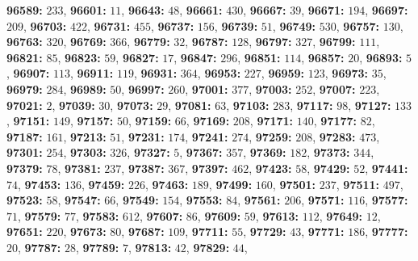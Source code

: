 \textsf{\bfseries 96589:} $233$, \textsf{\bfseries 96601:} $11$, \textsf{\bfseries 96643:} $48$, \textsf{\bfseries 96661:} $430$, \textsf{\bfseries 96667:} $39$, \textsf{\bfseries 96671:} $194$, \textsf{\bfseries 96697:} $209$, \textsf{\bfseries 96703:} $422$, \textsf{\bfseries 96731:} $455$, \textsf{\bfseries 96737:} $156$, \textsf{\bfseries 96739:} $51$, \textsf{\bfseries 96749:} $530$, \textsf{\bfseries 96757:} $130$, \textsf{\bfseries 96763:} $320$, \textsf{\bfseries 96769:} $366$, \textsf{\bfseries 96779:} $32$, \textsf{\bfseries 96787:} $128$, \textsf{\bfseries 96797:} $327$, \textsf{\bfseries 96799:} $111$, \textsf{\bfseries 96821:} $85$, \textsf{\bfseries 96823:} $59$, \textsf{\bfseries 96827:} $17$, \textsf{\bfseries 96847:} $296$, \textsf{\bfseries 96851:} $114$, \textsf{\bfseries 96857:} $20$, \textsf{\bfseries 96893:} $5$, \textsf{\bfseries 96907:} $113$, \textsf{\bfseries 96911:} $119$, \textsf{\bfseries 96931:} $364$, \textsf{\bfseries 96953:} $227$, \textsf{\bfseries 96959:} $123$, \textsf{\bfseries 96973:} $35$, \textsf{\bfseries 96979:} $284$, \textsf{\bfseries 96989:} $50$, \textsf{\bfseries 96997:} $260$, \textsf{\bfseries 97001:} $377$, \textsf{\bfseries 97003:} $252$, \textsf{\bfseries 97007:} $223$, \textsf{\bfseries 97021:} $2$, \textsf{\bfseries 97039:} $30$, \textsf{\bfseries 97073:} $29$, \textsf{\bfseries 97081:} $63$, \textsf{\bfseries 97103:} $283$, \textsf{\bfseries 97117:} $98$, \textsf{\bfseries 97127:} $133$, \textsf{\bfseries 97151:} $149$, \textsf{\bfseries 97157:} $50$, \textsf{\bfseries 97159:} $66$, \textsf{\bfseries 97169:} $208$, \textsf{\bfseries 97171:} $140$, \textsf{\bfseries 97177:} $82$, \textsf{\bfseries 97187:} $161$, \textsf{\bfseries 97213:} $51$, \textsf{\bfseries 97231:} $174$, \textsf{\bfseries 97241:} $274$, \textsf{\bfseries 97259:} $208$, \textsf{\bfseries 97283:} $473$, \textsf{\bfseries 97301:} $254$, \textsf{\bfseries 97303:} $326$, \textsf{\bfseries 97327:} $5$, \textsf{\bfseries 97367:} $357$, \textsf{\bfseries 97369:} $182$, \textsf{\bfseries 97373:} $344$, \textsf{\bfseries 97379:} $78$, \textsf{\bfseries 97381:} $237$, \textsf{\bfseries 97387:} $367$, \textsf{\bfseries 97397:} $462$, \textsf{\bfseries 97423:} $58$, \textsf{\bfseries 97429:} $52$, \textsf{\bfseries 97441:} $74$, \textsf{\bfseries 97453:} $136$, \textsf{\bfseries 97459:} $226$, \textsf{\bfseries 97463:} $189$, \textsf{\bfseries 97499:} $160$, \textsf{\bfseries 97501:} $237$, \textsf{\bfseries 97511:} $497$, \textsf{\bfseries 97523:} $58$, \textsf{\bfseries 97547:} $66$, \textsf{\bfseries 97549:} $154$, \textsf{\bfseries 97553:} $84$, \textsf{\bfseries 97561:} $206$, \textsf{\bfseries 97571:} $116$, \textsf{\bfseries 97577:} $71$, \textsf{\bfseries 97579:} $77$, \textsf{\bfseries 97583:} $612$, \textsf{\bfseries 97607:} $86$, \textsf{\bfseries 97609:} $59$, \textsf{\bfseries 97613:} $112$, \textsf{\bfseries 97649:} $12$, \textsf{\bfseries 97651:} $220$, \textsf{\bfseries 97673:} $80$, \textsf{\bfseries 97687:} $109$, \textsf{\bfseries 97711:} $55$, \textsf{\bfseries 97729:} $43$, \textsf{\bfseries 97771:} $186$, \textsf{\bfseries 97777:} $20$, \textsf{\bfseries 97787:} $28$, \textsf{\bfseries 97789:} $7$, \textsf{\bfseries 97813:} $42$, \textsf{\bfseries 97829:} $44$, 
